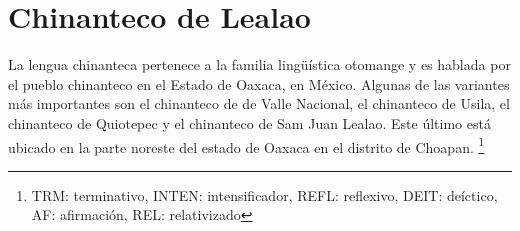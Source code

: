 \section*{Chinanteco de Lealao}

\noindent La lengua chinanteca pertenece a la familia lingüística otomange y es hablada por el pueblo chinanteco en el Estado de Oaxaca, en México. Algunas de las variantes más importantes son el chinanteco de de Valle Nacional, el chinanteco de Usila, el chinanteco de Quiotepec y el chinanteco de Sam Juan Lealao. Este último está ubicado en la parte noreste del estado de Oaxaca en el distrito de Choapan. %
\footnote{TRM: terminativo, INTEN: intensificador, REFL: reflexivo, DEIT: deíctico, AF: afirmación, REL: relativizado}
\vspace{1cm}

